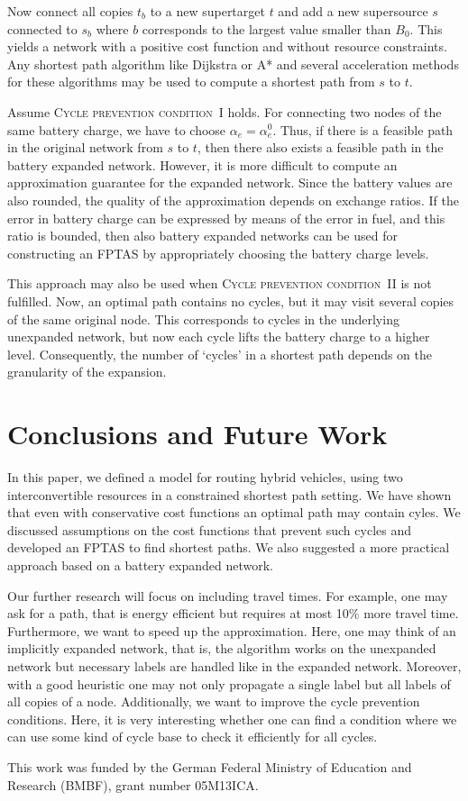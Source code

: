 \documentclass[a4paper]{scrartcl}
\begin{document}
Now connect all copies $t_b$ to a new supertarget $t$ and add a new supersource $s$ connected to $s_b$ where $b$ corresponds to the largest value smaller than $B_0$. This yields a network with a positive cost function and without resource constraints. Any shortest path algorithm like Dijkstra or A* and several acceleration methods for these algorithms may be used to compute a shortest path from $s$ to $t$.

Assume \textsc{Cycle prevention condition~I} holds. For connecting two nodes of the same battery charge, we have to choose $\alpha_e=\alpha_e^0$. Thus, if there is a feasible path in the original network from $s$ to $t$, then there also exists a feasible path in the battery expanded network. However, it is more difficult to compute an approximation guarantee for the expanded network. Since the battery values are also rounded, the quality of the approximation depends on exchange ratios. If the error in battery charge can be expressed by means of the error in fuel, and this ratio is bounded, then also battery expanded networks can be used for constructing an FPTAS by appropriately choosing the battery charge levels.

This approach may also be used when \textsc{Cycle prevention condition~II} is not fulfilled. Now, an optimal path contains no cycles, but it may visit several copies of the same original node. This corresponds to cycles in the underlying unexpanded network, but now each cycle lifts the battery charge to a higher level. Consequently, the number of `cycles' in a shortest path depends on the granularity of the expansion.

\section{Conclusions and Future Work}

In this paper, we defined a model for routing hybrid vehicles, using two interconvertible resources in a constrained shortest path setting. We have shown that even with conservative cost functions an optimal path may contain cyles. We discussed assumptions on the cost functions that prevent such cycles and developed an FPTAS to find shortest paths. We also suggested a more practical approach based on a battery expanded network.

Our further research will focus on including travel times. For example, one may ask for a path, that is energy efficient but requires at most 10\% more travel time. Furthermore, we want to speed up the approximation. Here, one may think of an implicitly expanded network, that is, the algorithm works on the unexpanded network but necessary labels are handled like in the expanded network. Moreover, with a good heuristic one may not only propagate a single label but all labels of all copies of a node. Additionally, we want to improve the cycle prevention conditions. Here, it is very interesting whether one can find a condition where we can use some kind of cycle base to check it efficiently for all cycles.

This work was funded by the German Federal Ministry of Education and Research (BMBF), grant number 05M13ICA.

\appendix

\end{document}
